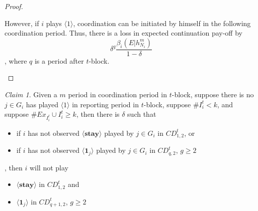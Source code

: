 \documentclass[12pt,letterpaper]{article}
\theoremstyle{definition}
\theoremstyle{remark}
\theoremstyle{claim}
\newtheorem{claim}{Claim}
\begin{document}
\begin{proof}
\begin{itemize}
However, if $i$ plays $\langle 1 \rangle$, coordination can be initiated by himself in the following coordination period. Thus, there is a loss in expected continuation pay-off by
\[\delta^{q}\frac{\beta_{i}(E|h^{m}_{N_i})}{1-\delta} \], where $q$ is a period after $t$-block.
\end{itemize}

\end{proof}




\begin{claim} 
\label{claim_report_with_no_message_coordination_period}
Given a $m$ period in coordination period in $t$-block, suppose there is no $j\in G_i$ has played $\langle 1 \rangle$ in reporting period in $t$-block, suppose $\# I^t_i<k$, and suppose $\# Ex_{I^{t}_i}\cup I^{t}_i \geq k$, then there is $\delta$ such that 
\begin{itemize}
\item if $i$ has not observed $\langle \textbf{stay} \rangle$ played by $j\in G_i$ in $CD^t_{1,2}$, or
\item if $i$ has not observed $\langle \mathbf{1}_j \rangle$ played by $j\in G_i$ in $CD^t_{q,2}$, $g\geq 2$
\end{itemize}
, then $i$ will not play
\begin{itemize}
\item $\langle \textbf{stay} \rangle$  in $CD^t_{1,2}$ and
\item $\langle \mathbf{1}_j \rangle$  in $CD^t_{q+1,2}$, $g\geq 2$
\end{itemize}
\end{claim}
\end{document}
